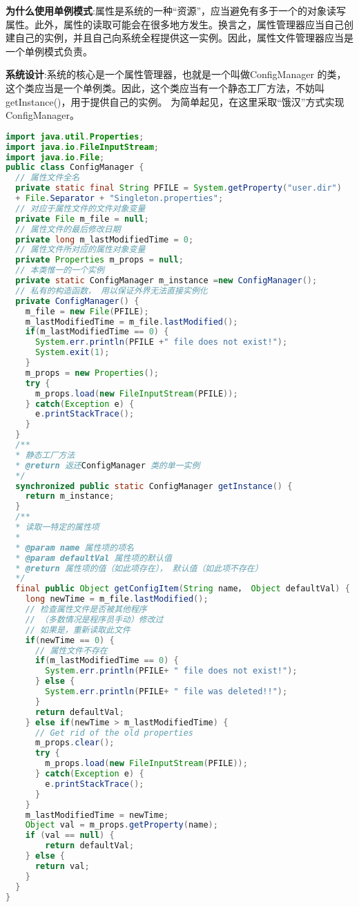 \documentclass[../main.tex]{subfiles}
\begin{document}
\textbf{为什么使用单例模式}:属性是系统的一种``资源''，应当避免有多于一个的对象读写属性。此外，属性的读取可能会在很多地方发生。换言之，属性管理器应当自己创建自己的实例，并且自己向系统全程提供这一实例。因此，属性文件管理器应当是一个单例模式负责。

\textbf{系统设计}:系统的核心是一个属性管理器，也就是一个叫做ConfigManager 的类，这个类应当是一个单例类。因此，这个类应当有一个静态工厂方法，不妨叫getInstance()，用于提供自己的实例。
为简单起见，在这里采取``饿汉''方式实现ConfigManager。
%
\begin{lstlisting}[language=java]
import java.util.Properties;
import java.io.FileInputStream;
import java.io.File;
public class ConfigManager {
  // 属性文件全名
  private static final String PFILE = System.getProperty("user.dir")
  + File.Separator + "Singleton.properties";
  // 对应于属性文件的文件对象变量
  private File m_file = null;
  // 属性文件的最后修改日期
  private long m_lastModifiedTime = 0;
  // 属性文件所对应的属性对象变量
  private Properties m_props = null;
  // 本类惟一的一个实例
  private static ConfigManager m_instance =new ConfigManager();
  // 私有的构造函数， 用以保证外界无法直接实例化
  private ConfigManager() {
    m_file = new File(PFILE);
    m_lastModifiedTime = m_file.lastModified();
    if(m_lastModifiedTime == 0) {
      System.err.println(PFILE +" file does not exist!");
      System.exit(1);
    }
    m_props = new Properties();
    try {
      m_props.load(new FileInputStream(PFILE));
    } catch(Exception e) {
      e.printStackTrace();
    }
  }
  /**
  * 静态工厂方法
  * @return 返还ConfigManager 类的单一实例
  */
  synchronized public static ConfigManager getInstance() {
    return m_instance;
  }
  /**
  * 读取一特定的属性项
  *
  * @param name 属性项的项名
  * @param defaultVal 属性项的默认值
  * @return 属性项的值（如此项存在）， 默认值（如此项不存在）
  */
  final public Object getConfigItem(String name， Object defaultVal) {
    long newTime = m_file.lastModified();
    // 检查属性文件是否被其他程序
    // （多数情况是程序员手动）修改过
    // 如果是，重新读取此文件
    if(newTime == 0) {
      // 属性文件不存在
      if(m_lastModifiedTime == 0) {
        System.err.println(PFILE+ " file does not exist!");
      } else {
        System.err.println(PFILE+ " file was deleted!!");
      }
      return defaultVal;
    } else if(newTime > m_lastModifiedTime) {
      // Get rid of the old properties
      m_props.clear();
      try {
        m_props.load(new FileInputStream(PFILE));
      } catch(Exception e) {
        e.printStackTrace();
      }
    }
    m_lastModifiedTime = newTime;
    Object val = m_props.getProperty(name);
    if (val == null) {
        return defaultVal;
    } else {
      return val;
    }
  }
}
\end{lstlisting}
\end{document}
